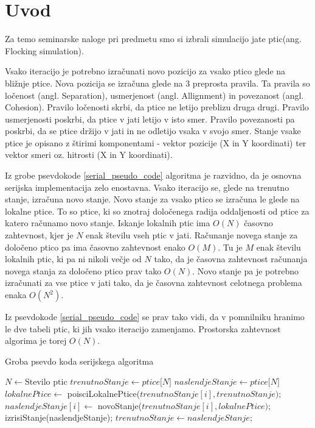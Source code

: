 \documentclass[a4paper, 12pt]{book}
\newcommand{\clearemptydoublepage}{\newpage{\pagestyle{empty}\cleardoublepage}}
\begin{document}
\clearemptydoublepage



\mainmatter
\setcounter{page}{1}
\pagestyle{fancy}

\chapter{Uvod}
Za temo seminarske naloge pri predmetu smo si izbrali simulacijo jate ptic(ang. Flocking simulation).

Vsako iteracijo je potrebno izračunati novo pozicijo za vsako ptico glede na bližnje ptice. Nova pozicija se izračuna glede na 3 preprosta pravila. Ta pravila so ločenost (angl. Separation), usmerjenost (angl. Allignment) in povezanost (angl. Cohesion). Pravilo ločenosti skrbi, da ptice ne letijo preblizu druga drugi. Pravilo usmerjenosti poskrbi, da ptice v jati letijo v isto smer. Pravilo povezanosti pa poskrbi, da se ptice držijo v jati in ne odletijo vsaka v svojo smer. Stanje vsake ptice je opisano z štirimi komponentami - vektor pozicije (X in Y koordinati) ter vektor smeri oz. hitrosti (X in Y koordinati). 

Iz grobe psevdokode \ref{serial_pseudo_code} algoritma je razvidno, da je osnovna serijska implementacija zelo enostavna. Vsako iteracijo se, glede na trenutno stanje, izračuna novo stanje. Novo stanje za vsako ptico se izračuna le glede na lokalne ptice. To so ptice, ki so znotraj določenega radija oddaljenosti od ptice za katero računamo novo stanje. Iskanje lokalnih ptic ima $O(N)$ časovno zahtevnost, kjer je $N$ enak številu vseh ptic v jati. Računanje novega stanje za določeno ptico pa ima časovno zahtevnost enako $O(M)$. Tu je $M$ enak številu lokalnih ptic, ki pa ni nikoli večje od $N$ tako, da je časovna zahtevnost računanja novega stanja za določeno ptico prav tako $O(N)$. Novo stanje pa je potrebno izračunati za vse ptice v jati tako, da je časovna zahtevnost celotnega problema enaka $O(N^2)$. 

Iz psevdokode \ref{serial_pseudo_code} se prav tako vidi, da v pomnilniku hranimo le dve tabeli ptic, ki jih vsako iteracijo zamenjamo. Prostorska zahtevnost algorima je torej $O(N)$.

\begin{algorithm}
\caption{Groba psevdo koda serijskega algoritma}\label{serial_pseudo_code}
\begin{algorithmic}[1]
\State $N \gets \text{Stevilo ptic}$
\State $trenutnoStanje \gets \textit{ptice[N]}$
\State $naslendjeStanje \gets \textit{ptice[N]}$
\Loop
{}
\State $lokalnePtice \gets$ poisciLokalnePtice($trenutnoStanje[i], trenutnoStanje);$
\State $naslendjeStanje[i] \gets$ novoStanje($trenutnoStanje[i], lokalnePtice);$
\EndFor
\State izrisiStanje(naslendjeStanje);
\State $trenutnoStanje \gets naslendjeStanje;$
\EndLoop
\end{algorithmic}
\end{algorithm}
\end{document}
